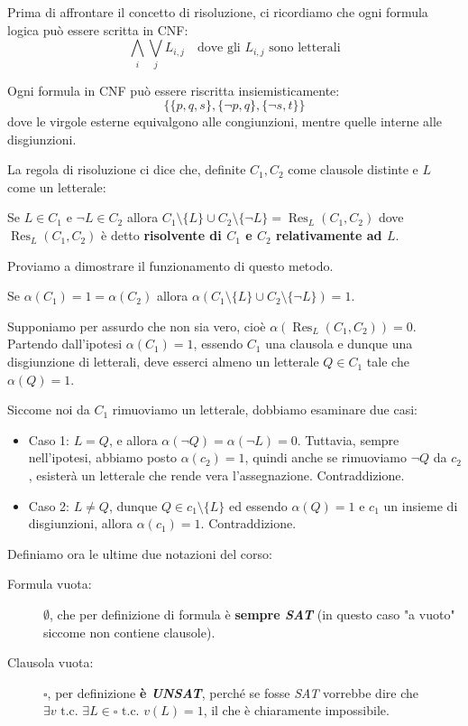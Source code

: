 \documentclass[12pt]{report}
\begin{document}
	Prima di affrontare il concetto di risoluzione, ci ricordiamo che ogni formula logica può essere scritta in CNF:
	\[
	\bigwedge_i \bigvee_j L_{i,j} \quad \text{dove gli } L_{i,j} \text{ sono letterali}
	\]
	
	Ogni formula in CNF può essere riscritta insiemisticamente:
	\[
	\{ \{p, q, s\}, \{\neg p, q\}, \{\neg s, t\} \}
	\]
	dove le virgole esterne equivalgono alle congiunzioni, mentre quelle interne alle disgiunzioni.
	
	La regola di risoluzione ci dice che, definite $C_1, C_2$ come clausole distinte e $L$ come un letterale:
	
	Se $L \in C_1$ e $\neg L \in C_2$ allora $C_1 \setminus \{L\} \cup C_2 \setminus \{\neg L\} = \operatorname{Res}_L(C_1, C_2)$ dove $\operatorname{Res}_L(C_1, C_2)$ è detto \textbf{risolvente di $C_1$ e $C_2$ relativamente ad $L$}.
	
	Proviamo a dimostrare il funzionamento di questo metodo.
	\begin{osservazione}{}{}
		Se $\alpha(C_1) = 1 = \alpha(C_2)$ allora $\alpha(C_1 \setminus \{L\} \cup C_2 \setminus \{\neg L\}) = 1$.
	\end{osservazione}
	
	Supponiamo per assurdo che non sia vero, cioè $\alpha(\operatorname{Res}_L(C_1, C_2)) = 0$.
	Partendo dall'ipotesi $\alpha(C_1) = 1$, essendo $C_1$ una clausola e dunque una disgiunzione di letterali, deve esserci almeno un letterale $Q \in C_1$ tale che $\alpha(Q) = 1$.
	
	Siccome noi da $C_1$ rimuoviamo un letterale, dobbiamo esaminare due casi:
	
	\begin{itemize}
		\item Caso 1: $L = Q$, e allora $\alpha(\neg Q) = \alpha(\neg L) = 0$. Tuttavia, sempre nell'ipotesi, abbiamo posto $\alpha(c_2) = 1$, quindi anche se rimuoviamo $\neg Q$ da $c_2$, esisterà un letterale che rende vera l'assegnazione. Contraddizione.
		\item Caso 2: $L \neq Q$, dunque $Q \in c_1 \setminus \{L\}$ ed essendo $\alpha(Q) = 1$ e $c_1$ un insieme di disgiunzioni, allora $\alpha(c_1) = 1$. Contraddizione.
	\end{itemize}
	
	Definiamo ora le ultime due notazioni del corso:
	\begin{description}
		\item [Formula vuota:] $\emptyset$, che per definizione di formula è \textbf{sempre \emph{SAT}} (in questo caso "a vuoto" siccome non contiene clausole).
		\item [Clausola vuota:] $\square$, per definizione \textbf{è \emph{UNSAT}}, perché se fosse \emph{SAT} vorrebbe dire che $\exists v \text{ t.c. } \exists L \in \square \text{ t.c. } v(L) = 1$, il che è chiaramente impossibile.
	\end{description}
	
\end{document}
